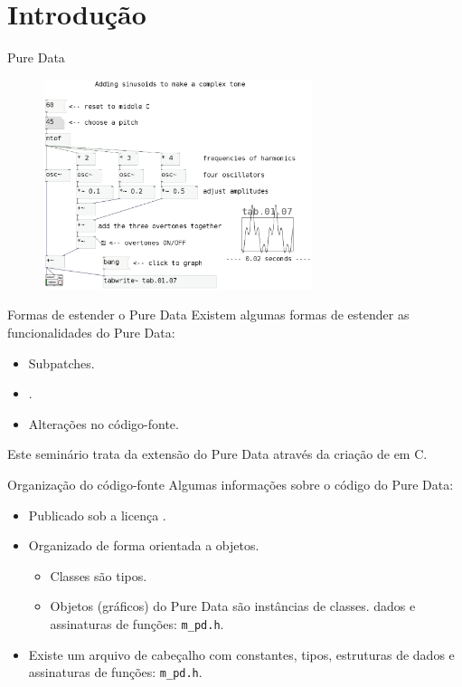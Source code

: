 \section{Introdução}

\begin{frame}{Pure Data}
\begin{figure}
\centering
\includegraphics[width=0.7\textwidth]{../images/pd-facil}
\end{figure}
\end{frame}


\begin{frame}{Formas de estender o Pure Data}
Existem algumas formas de estender as funcionalidades do Pure Data:
\begin{itemize}
\item Subpatches.
\item {}.
\item Alterações no código-fonte.
\end{itemize}
\pause
\vspace{1em}
Este seminário trata da extensão do Pure Data através da criação de
\externals em C.
\end{frame}


\begin{frame}[fragile]{Organização do código-fonte}
Algumas informações sobre o código do Pure Data:
\begin{itemize}
\item Publicado sob a licença .
\item Organizado de forma orientada a objetos.
\begin{itemize}
\item Classes são tipos.
\item Objetos (gráficos) do Pure Data são instâncias de classes.
dados e assinaturas de funções: \texttt{m\_pd.h}.
\end{itemize}
\item Existe um arquivo de cabeçalho com constantes, tipos, estruturas de
dados e assinaturas de funções: \texttt{m\_pd.h}.
\end{itemize}
\end{frame}


